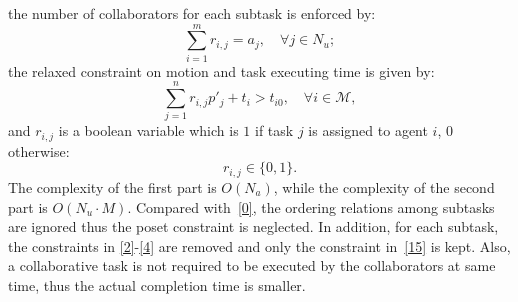 the number of collaborators for each subtask is enforced by:
\begin{equation}
\sum_{i=1}^{m}r_{i,j} = a_{j},\quad  \forall j \in N_u;
\label{15}
\end{equation}
the relaxed constraint on motion and task executing time is given by:
\begin{equation}
\sum_{j=1}^{n}r_{i,j}p'_j +t_i > t_{i0}, \quad \forall i \in \mathcal{M},
\label{16}
\end{equation}
and $r_{i,j}$ is a boolean variable which is $1$ if task $j$ is assigned to agent $i$,
$0$ otherwise:
\begin{equation}
r_{i,j} \in\{0,1\}.
\label{17}
\end{equation}
The complexity of the first part is $O(N_a)$, while the complexity of
the second part is $O(N_u\cdot M)$.
Compared with~\eqref{0}, the ordering relations among subtasks are ignored
thus the poset constraint is neglected. In addition,
for each subtask, the constraints in \eqref{2}-\eqref{4} are removed
and only the constraint in~\eqref{15} is kept.
Also, a collaborative task is not required to be executed by the collaborators
at same time, thus the actual completion time is smaller.

